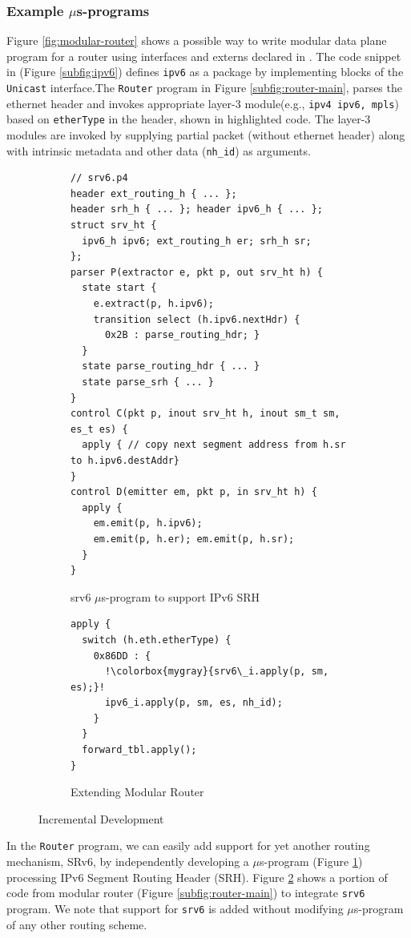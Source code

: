 \documentclass[letterpaper,twocolumn,10pt]{article}
\begin{document}
\subsubsection*{Example $\mu$s-programs}
Figure \ref{fig:modular-router} shows a possible way to write modular data plane program for a router using interfaces and externs declared in \uarch.
The code snippet in (Figure \ref{subfig:ipv6}) defines \texttt{ipv6} as a package by implementing blocks of the \texttt{Unicast} interface.\footnotemark[\value{footnote}]
The \texttt{Router} program in Figure \ref{subfig:router-main}, parses the ethernet header and invokes appropriate layer-3 module(e.g., \texttt{ipv4 ipv6, mpls}) based on \texttt{etherType} in the header, shown in highlighted code.
The layer-3 modules are invoked by supplying partial packet (without ethernet header) along with intrinsic metadata and other data (\texttt{nh\_id}) as arguments.
\begin{figure}[!h]
\begin{subfigure}[b]{\linewidth}
 \begin{lstlisting}[frame=none]
// srv6.p4
header ext_routing_h { ... }; 
header srh_h { ... }; header ipv6_h { ... }; 
struct srv_ht { 
  ipv6_h ipv6; ext_routing_h er; srh_h sr;
};
parser P(extractor e, pkt p, out srv_ht h) {
  state start {
    e.extract(p, h.ipv6);
    transition select (h.ipv6.nextHdr) {
      0x2B : parse_routing_hdr; }
  }
  state parse_routing_hdr { ... }
  state parse_srh { ... }
}
control C(pkt p, inout srv_ht h, inout sm_t sm, es_t es) {
  apply { // copy next segment address from h.sr to h.ipv6.destAddr}
}
control D(emitter em, pkt p, in srv_ht h) {
  apply { 
    em.emit(p, h.ipv6);
    em.emit(p, h.er); em.emit(p, h.sr);
  }
}
\end{lstlisting}
\caption{srv6 $\mu$s-program to support IPv6 SRH}
\label{subfig:srv6}
\end{subfigure}
\begin{subfigure}[b]{\linewidth}
 \begin{lstlisting}[frame=none, escapechar=!]
apply {
  switch (h.eth.etherType) {
    0x86DD : { 
      !\colorbox{mygray}{srv6\_i.apply(p, sm, es);}!
      ipv6_i.apply(p, sm, es, nh_id);
    }
  }
  forward_tbl.apply(); 
}
\end{lstlisting}
\caption{Extending Modular Router}
\label{subfig:extending-modular-router}
\end{subfigure}
\caption{Incremental Development}
\label{fig:incremental-development}
\end{figure}
In the \texttt{Router} program, we can easily add support for yet another routing mechanism, SRv6, by independently developing a $\mu$s-program (Figure \ref{subfig:srv6}) processing IPv6 Segment Routing Header (SRH).
Figure \ref{subfig:extending-modular-router} shows a portion of code from modular router (Figure \ref{subfig:router-main}) to integrate \texttt{srv6} program.
We note that support for \texttt{srv6} is added without modifying $\mu$s-program of any other routing scheme.
\end{document}
